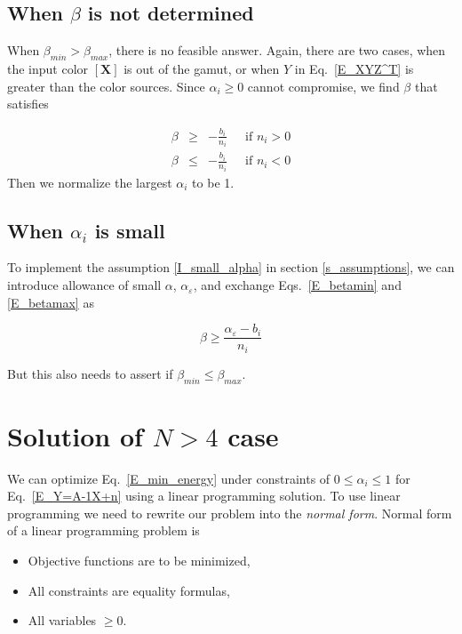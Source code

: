 \documentclass[dvipdfmx,uplatex,a4paper]{article}
\begin{document}
\subsection{When $\beta$ is not determined}

When $\beta_{min} > \beta_{max}$, there is no feasible answer. Again, there are two cases, when the input color $[\boldsymbol{X}]$ is out of the gamut, or when $Y$ in Eq.~\eqref{E_XYZ^T} is greater than the color sources. Since $\alpha_i \geq 0$ cannot compromise, we find $\beta$ that satisfies

\begin{eqnarray}
  \beta & \geq & - \frac{b_i}{n_i} \;\;\;\; \text{ if \(n_i > 0\)} \label{E_beta0min} \\
  \beta & \leq & - \frac{b_i}{n_i} \;\;\;\; \text{ if \(n_i < 0\)} \label{E_beta0miax}
\end{eqnarray}
Then we normalize the largest $\alpha_i$ to be 1.

\subsection{When $\alpha_i$ is small}

To implement the assumption \ref{I_small_alpha} in section \ref{s_assumptions}, we can introduce allowance of small $\alpha$, $\alpha_\varepsilon$, and exchange Eqs.~\eqref{E_betamin} and \eqref{E_betamax} as

\begin{equation}
  \beta \geq \frac{\alpha_\varepsilon - b_i}{n_i}
\end{equation}

But this also needs to assert if $\beta_{min} \leq \beta_{max}$.




\section{Solution of $N > 4$ case}
We can optimize Eq.~\eqref{E_min_energy} under constraints of $0 \leq \alpha_i \leq 1$ for Eq.~\eqref{E_Y=A-1X+n} using a linear programming solution\cite{LP_NRC}.
To use linear programming we need to rewrite our problem into the \textit{normal form}. Normal form of a linear programming problem is

\begin{itemize}
  \item Objective functions are to be minimized,
  \item All constraints are equality formulas,
  \item All variables $ \geq 0$.
\end{itemize}
\end{document}
